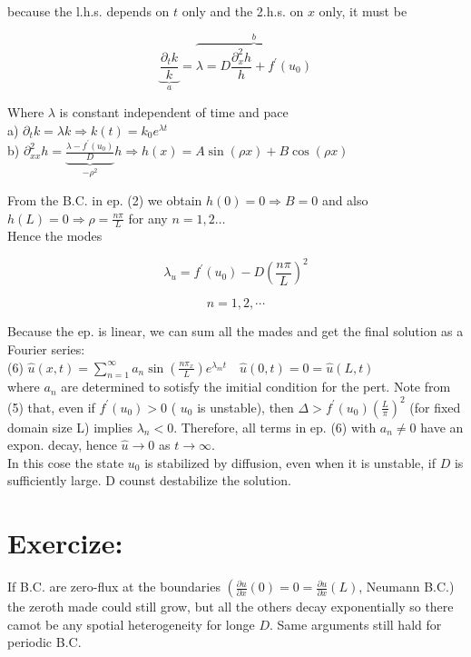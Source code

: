 \documentclass[10pt]{article}
\begin{document}
because the l.h.s. depends on $t$ only and the 2.h.s. on $x$ only, it must be

$$
\underbrace{\frac{\partial_{t} k}{k}}_{a}=\overbrace{\lambda=D \frac{\partial_{x}^{2} h}{h}+f^{\prime}\left(u_{0}\right)}^{b}
$$

Where $\lambda$ is constant independent of time and pace\\
a) $\partial_{t} k=\lambda k \Rightarrow k(t)=k_{0} e^{\lambda t}$\\
b) $\partial_{x x}^{2} h=\underbrace{\frac{\lambda-f^{\prime}\left(u_{0}\right)}{D}}_{-\rho^{2}} h \Rightarrow h(x)=A \sin (\rho x)+B \cos (\rho x)$

From the B.C. in ep. (2) we obtain $h(0)=0 \Rightarrow B=0$ and also $h(L)=0 \Rightarrow \rho=\frac{n \pi}{L}$ for any $n=1,2 \ldots$\\
Hence the modes


\begin{equation*}
\lambda_{u}=f^{\prime}\left(u_{0}\right)-D\left(\frac{n \pi}{L}\right)^{2} \tag{5}
\end{equation*}


$$
n=1,2, \cdots
$$

Because the ep. is linear, we can sum all the mades and get the final solution as a Fourier series:\\
(6) $\hat{u}(x, t)=\sum_{n=1}^{\infty} a_{n} \sin \left(\frac{n \pi_{x}}{L}\right) e^{\lambda_{m} t} \quad \hat{u}(0, t)=0=\hat{u}(L, t)$\\
where $a_{n}$ are determined to sotisfy the imitial condition for the pert. Note from (5) that, even if $f^{\prime}\left(u_{0}\right)>0$ ( $u_{0}$ is unstable), then $\Delta>f^{\prime}\left(u_{0}\right)\left(\frac{L}{\pi}\right)^{2}$ (for fixed domain size L) implies $\lambda_{n}<0$. Therefore, all terms in ep. (6) with $a_{n} \neq 0$ have an expon. decay, hence $\hat{u} \rightarrow 0$ as $t \rightarrow \infty$.\\
In this cose the state $u_{0}$ is stabilized by diffusion, even when it is unstable, if $D$ is sufficiently large. D counst destabilize the solution.

\section*{Exercize:}
If B.C. are zero-flux at the boundaries $\left(\frac{\partial u}{\partial x}(0)=0=\frac{\partial u}{\partial x}(L)\right.$, Neumann B.C.) the zeroth made could still grow, but all the others decay exponentially so there camot be any spotial heterogeneity for longe $D$. Same arguments still hald for periodic B.C.
\end{document}
